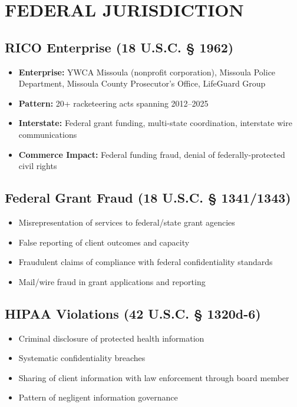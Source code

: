 \documentclass[12pt,oneside]{article}
\begin{document}
\section*{FEDERAL JURISDICTION}

\subsection*{RICO Enterprise (18 U.S.C. § 1962)}

\begin{itemize}
\item \textbf{Enterprise:} YWCA Missoula (nonprofit corporation), Missoula Police Department, Missoula County Prosecutor's Office, LifeGuard Group
\item \textbf{Pattern:} 20+ racketeering acts spanning 2012--2025
\item \textbf{Interstate:} Federal grant funding, multi-state coordination, interstate wire communications
\item \textbf{Commerce Impact:} Federal funding fraud, denial of federally-protected civil rights
\end{itemize}

\subsection*{Federal Grant Fraud (18 U.S.C. § 1341/1343)}

\begin{itemize}
\item Misrepresentation of services to federal/state grant agencies
\item False reporting of client outcomes and capacity
\item Fraudulent claims of compliance with federal confidentiality standards
\item Mail/wire fraud in grant applications and reporting
\end{itemize}

\subsection*{HIPAA Violations (42 U.S.C. § 1320d-6)}

\begin{itemize}
\item Criminal disclosure of protected health information
\item Systematic confidentiality breaches
\item Sharing of client information with law enforcement through board member
\item Pattern of negligent information governance
\end{itemize}
\end{document}
